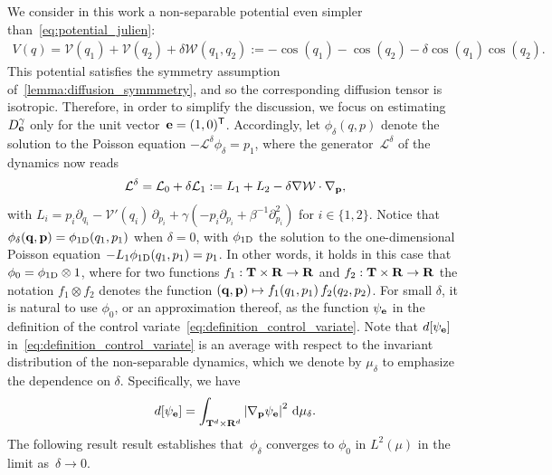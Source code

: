 \documentclass[11pt,a4paper]{article}
\begin{document}
We consider in this work a non-separable potential even simpler than~\eqref{eq:potential_julien}:
\begin{align}
    \label{eq:potential_simple}
    V(q) =  \mathcal V(q_1) + \mathcal V(q_2) + \delta \mathcal W(q_1, q_2) := - \cos(q_1) - \cos(q_2) - \delta \cos(q_1) \cos(q_2).
\end{align}
This potential satisfies the symmetry assumption of~\cref{lemma:diffusion_symmmetry},
and so the corresponding diffusion tensor is isotropic.
Therefore, in order to simplify the discussion,
we focus on estimating~$D^{\gamma}_{\boldsymbol{\mathbf e}}$ only for the unit vector~$\boldsymbol{\mathbf e} = (1, 0)^\mathsf T$.
Accordingly, let $\phi_\delta(q, p)$ denote the solution to the Poisson equation $- \mathcal L^{\delta} \phi_\delta = p_1$,
where the generator~$\mathcal L^{\delta}$ of the dynamics now reads
\begin{align}
    \label{eq:generator}
    \mathcal L^{\delta} = \mathcal L_0 + \delta \mathcal L_1
    := L_1 + L_2
    - \delta \nabla \mathcal W \cdot \nabla_{\boldsymbol{\mathbf p}},
\end{align}
with $L_i = p_i \partial_{q_i} - \mathcal V'(q_i) \, \partial_{p_i} + \gamma \left(- p_i \partial_{p_i} + \beta^{-1} \partial^2_{p_i} \right)$
for $i \in \{1, 2\}$.
Notice that $\phi_\delta(\boldsymbol{\mathbf q}, \boldsymbol{\mathbf p}) = \phi_{\rm 1D}(q_1, p_1)$ when $\delta = 0$,
with $\phi_{\rm 1D}$ the solution to the one-dimensional Poisson equation $-L_1 \phi_{\rm 1D}(q_1, p_1) = p_1$.
In other words, it holds in this case that $\phi_0 = \phi_{\rm 1D} \otimes 1$,
where for two functions $f_1: \mathbf T \times \mathbf R \rightarrow \mathbf R$ and $f_2: \mathbf T \times \mathbf R \rightarrow \mathbf R$
the notation $f_1 \otimes f_2$ denotes the function $(\boldsymbol{\mathbf q}, \boldsymbol{\mathbf p}) \mapsto f_1(q_1,p_1) \, f_2(q_2,p_2)$.
For small $\delta$, it is natural to use $\phi_0$, or an approximation thereof,
as the function $\psi_{\boldsymbol{\mathbf e}}$ in the definition of the control variate~\eqref{eq:definition_control_variate}.
Note that $d[\psi_{\boldsymbol{\mathbf e}}]$ in~\eqref{eq:definition_control_variate} is an average with respect to the invariant distribution of the non-separable dynamics,
which we denote by $\mu_{\delta}$ to emphasize the dependence on $\delta$.
Specifically, we have
\begin{equation}
    \label{eq:effective_diffusion_d}
    d[\psi_{\vect e}]
    = \int_{\torus^d \times \real^d} \abs{\grad_{\vect p} \psi_{\vect e}}^2 \, \d \mu_{\delta}.
\end{equation}
The following result result establishes that~$\phi_\delta$ converges to $\phi_0$ in $L^2(\mu)$ in the limit as~$\delta \to 0$.
\end{document}
